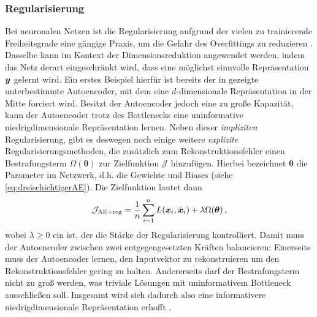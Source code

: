 \subsubsection{Regularisierung}
\label{ch:MethodenDerDimRed:ML:AE:Regularisierung}
Bei neuronalen Netzen ist die Regularisierung aufgrund der vielen zu trainierende Freiheitsgrade eine gängige Praxis, um die Gefahr des Overfittings zu reduzieren \parencite[228]{Goodfellow.2016}. Dasselbe kann im Kontext der Dimensionsreduktion angewendet werden,
indem das Netz derart eingeschränkt wird, dass eine möglichst sinnvolle Repräsentation $\bm{y}$
gelernt wird. Ein erstes Beispiel hierfür ist bereits der in 
gezeigte unterbestimmte Autoencoder, mit dem eine $d$-dimensionale Repräsentation in der Mitte
forciert wird. Besitzt der Autoencoder jedoch eine zu große Kapazität, kann der Autoencoder trotz
des Bottlenecks eine uninformative niedrigdimensionale Repräsentation lernen. Neben dieser
\textit{impliziten} Regularisierung, gibt es deswegen noch einige weitere \textit{explizite}
Regularisierungsmethoden, die zusätzlich zum Rekonstruktionsfehler einen Bestrafungsterm
$\Omega(\bm{\theta})$ zur Zielfunktion $\mathcal{J}$ hinzufügen. Hierbei bezeichnet $\bm{\theta}$
die Parameter im Netzwerk, d.h. die Gewichte und Biases (siehe \eqref{eq:dreischichtigerAE}). Die
Zielfunktion lautet dann
\begin{equation}
	\mathcal{J}_{\text{AE+reg}} = \frac{1}{n} \sum_{i = 1}^{n}  L(\bm{x}_i, \hat{\bm{x}}_i) + \lambda \Omega(\bm{\theta}) \, ,
\end{equation}
wobei $\lambda \geq 0$ ein  ist, der die Stärke der Regularisierung kontrolliert. Damit muss der Autoencoder zwischen zwei entgegengesetzten Kräften balancieren: Einerseits muss der Autoencoder lernen, den Inputvektor zu rekonstruieren um den Rekonstruktionsfehler gering zu halten. Andererseits darf der Bestrafungsterm nicht zu groß werden, was triviale Lösungen mit uninformativem Bottleneck ausschließen soll. Insgesamt wird sich dadurch also eine informativere niedrigdimensionale Repräsentation erhofft \parencite[516]{Goodfellow.2016}.

